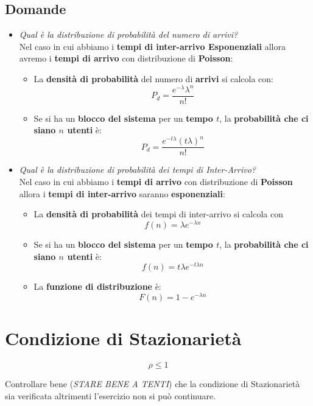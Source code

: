 \subsection{Domande} %

\begin{itemize}
    \item \textit{Qual è la distribuzione di probabilità del numero di arrivi?}
          \vspace{0.3cm}
          \\Nel caso in cui abbiamo i \textbf{tempi di inter-arrivo
              Esponenziali} allora avremo i \textbf{tempi di arrivo} con
          distribuzione di \textbf{Poisson}:
          \begin{itemize}
              \item La \textbf{densità di probabilità} del numero di
                    \textbf{arrivi} si calcola con:
                    $$P_d = \frac{e^{-\lambda} \lambda^n}{n!}$$
              \item Se si ha un \textbf{blocco del sistema} per un \textbf{tempo
                        $t$}, la \textbf{probabilità che ci siano $n$ utenti} è:
                    $$P_d = \frac{e^{-t\lambda} \left ( t\lambda \right
                            )^n}{n!}$$
          \end{itemize}

    \item \textit{Qual è la distribuzione di probabilità dei tempi di
              Inter-Arrivo?}
          \vspace{0.3cm}
          \\Nel caso in cui abbiamo i \textbf{tempi di arrivo} con distribuzione
          di \textbf{Poisson} allora i \textbf{tempi di inter-arrivo} saranno
          \textbf{esponenziali}:
          \begin{itemize}
              \item La \textbf{densità di probabilità} dei tempi di inter-arrivo
                    si calcola con $$f(n) = \lambda e^{-\lambda n}$$
              \item Se si ha un \textbf{blocco del sistema} per un \textbf{tempo
                        $t$}, la \textbf{probabilità che ci siano $n$ utenti} è:
                    $$f(n) = t\lambda e^{-t\lambda n}$$
              \item La \textbf{funzione di distribuzione} è: $$F(n) = 1 -
                        e^{-\lambda n}$$
          \end{itemize}
\end{itemize}

\section{Condizione di Stazionarietà}

$$
    \rho \le 1
$$

Controllare bene (\textit{STARE BENE A TENTI}) che la condizione di
Stazionarietà sia verificata altrimenti l'esercizio non si può continuare.
